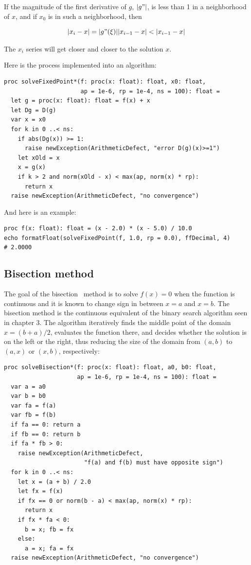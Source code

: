 \documentclass[justified, sixbynine]{tufte-book}
\def\ft{\small\tt}
\theoremstyle{plain}%
\newtheorem * {corollary}{Corollary}
\theoremstyle{definition}
\theoremstyle{remark}
\newtheorem * {remark}{Remark}
\newtheorem * {note}{Note}
\begin{document}
\begin{fullwidth}
If the magnitude of the first derivative of $g$, $|g"|$, is less than 1 in a neighborhood of $x$, and if $x_0$ is in such a neighborhood, then

\begin{equation}
|x_i - x| = |g"(\xi)||x_{i-1}-x| < |x_{i-1}-x|
\end{equation}

The $x_i$ series will get closer and closer to the solution $x$.

Here is the process implemented into an algorithm:

\begin{lstlisting}[caption={in file: {\ft nlib/solvers.nim}}]
proc solveFixedPoint*(f: proc(x: float): float, x0: float,
                      ap = 1e-6, rp = 1e-4, ns = 100): float =
  let g = proc(x: float): float = f(x) + x
  let Dg = D(g)
  var x = x0
  for k in 0 ..< ns:
    if abs(Dg(x)) >= 1:
      raise newException(ArithmeticDefect, "error D(g)(x)>=1")
    let xOld = x
    x = g(x)
    if k > 2 and norm(xOld - x) < max(ap, norm(x) * rp):
      return x
  raise newException(ArithmeticDefect, "no convergence")
\end{lstlisting}

And here is an example:

\begin{lstlisting}
proc f(x: float): float = (x - 2.0) * (x - 5.0) / 10.0
echo formatFloat(solveFixedPoint(f, 1.0, rp = 0.0), ffDecimal, 4)
# 2.0000
\end{lstlisting}

\goodbreak\subsection{Bisection method}


The goal of the bisection~\cite{bisection} method is to solve $f(x)=0$ when the function is continuous and it is known to change sign in between $x=a$ and $x=b$. The bisection method is the continuous equivalent of the binary search algorithm seen in chapter 3. The algorithm iteratively finds the middle point of the domain $x=(b+a)/2$, evaluates the function there, and decides whether the solution is on the left or the right, thus reducing the size of the domain from $(a, b)$ to $(a, x)$ or $(x, b)$, respectively:

\begin{lstlisting}[caption={in file: {\ft nlib/solvers.nim}}]
proc solveBisection*(f: proc(x: float): float, a0, b0: float,
                     ap = 1e-6, rp = 1e-4, ns = 100): float =
  var a = a0
  var b = b0
  var fa = f(a)
  var fb = f(b)
  if fa == 0: return a
  if fb == 0: return b
  if fa * fb > 0:
    raise newException(ArithmeticDefect,
                       "f(a) and f(b) must have opposite sign")
  for k in 0 ..< ns:
    let x = (a + b) / 2.0
    let fx = f(x)
    if fx == 0 or norm(b - a) < max(ap, norm(x) * rp):
      return x
    if fx * fa < 0:
      b = x; fb = fx
    else:
      a = x; fa = fx
  raise newException(ArithmeticDefect, "no convergence")
\end{lstlisting}


\end{fullwidth}
\end{document}
